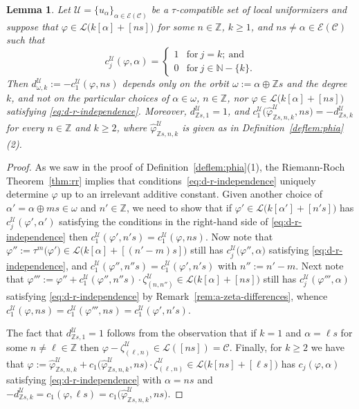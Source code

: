 \documentclass[preprint,12pt]{elsarticle}
\numberwithin{equation}{section} %
\theoremstyle{theorem}
\newtheorem{lemma}[theorem]{Lemma}
\theoremstyle{definition}
\newcommand{\Ca}{\mathcal{C}} %
\newcommand{\ec}{\mathcal{E}} %
\newcommand{\Z}{\mathbb{Z}} %
\newcommand{\za}[2]{\zeta^{\mathcal{U}}_{( {#1} , {#2} )}}
\begin{document}
\begin{lemma}\label{lem:d-r-independence} Let $\mathcal{U}=\{u_\alpha\}_{\alpha\in\ec(\Ca)}$ be a $\tau$-compatible set of local uniformizers and suppose that $\varphi\in\mathcal{L}\bigl(k[\alpha]+[ns]\bigr)$ for some $n\in\Z$, $k\geq 1$, and $ns\neq\alpha\in\ec(\Ca)$ such that \begin{equation}\label{eq:d-r-independence}c_j^\mathcal{U}(\varphi,\alpha)=\begin{cases} 1 & \text{for} \ j=k; \ \text{and} \\0 & \text{for} \ j\in\mathbb{N}-\{ k\}.\end{cases}\end{equation} Then $d^\mathcal{U}_{\omega,k}:=-c_1^\mathcal{U}(\varphi,ns)$ depends only on the orbit $\omega:=\alpha\oplus \Z s$ and the degree~$k$, and not on the particular choices of $\alpha\in\omega$, $n\in\Z$, nor $\varphi\in\mathcal{L}\bigl(k[\alpha]+[ns]\bigr)$ satisfying \eqref{eq:d-r-independence}. Moreover, $d^\mathcal{U}_{\Z s,1}=1$, and $c_1^\mathcal{U}\bigl(\hat{\varphi}^\mathcal{U}_{\Z s,n,k},ns\bigr)=-d^\mathcal{U}_{\Z s, k}$ for every $n\in\Z$ and $k\geq 2$, where $\hat{\varphi}^\mathcal{U}_{\Z s, n, k}$ is given as in Definition~\ref{deflem:phia}(2).
\end{lemma}

\begin{proof}
    As we saw in the proof of Definition~\ref{deflem:phia}(1), the Riemann-Roch Theorem~\ref{thm:rr} implies that conditions~\ref{eq:d-r-independence} uniquely determine $\varphi$ up to an irrelevant additive constant. Given another choice of $\alpha'=\alpha\oplus ms\in\omega$ and $n'\in\Z$, we need to show that if $\varphi'\in\mathcal{L}\bigl(k[\alpha']+[n's]\bigr)$ has $c_j^\mathcal{U}(\varphi',\alpha')$ satisfying the conditions in the right-hand side of \eqref{eq:d-r-independence} then $c_1^\mathcal{U}(\varphi',n's)=c_1^\mathcal{U}(\varphi,ns)$. Now note that
    $\varphi'':=\tau^m\bigl(\varphi'\bigr)\in\mathcal{L}\bigl(k[\alpha]+[(n'-m)s]\bigr)$
    still has $c_j^\mathcal{U}\bigl(\varphi'',\alpha\bigr)$ satisfying \eqref{eq:d-r-independence}, and $c_1^\mathcal{U}(\varphi'',n''s)=c_1^\mathcal{U}(\varphi',n's)$ with $n'':=n'-m$. Next note that
    $\varphi''':=\varphi''+c_1^\mathcal{U}(\varphi'',n''s)\cdot\za{n}{n''}\in\mathcal{L}\bigl(k[\alpha]+[ns]\bigr)$
    still has $c_j^\mathcal{U}(\varphi''',\alpha)$ satisfying \eqref{eq:d-r-independence} by Remark~\ref{rem:a-zeta-differences}, whence $c_1^\mathcal{U}(\varphi,ns)=c_1^\mathcal{U}(\varphi''',ns)=c_1^\mathcal{U}(\varphi',n's)$.
    
    The fact that $d_{\Z s,1}^{\mathcal{U}}=1$ follows from the observation that if $k=1$ and $\alpha=\ell s$ for some $n\neq \ell\in\Z$ then $\varphi-\za{\ell}{n}\in\mathcal{L}([ns])=\Ca$. Finally, for $k\geq 2$ we have that
    $\varphi:=\hat{\varphi}^\mathcal{U}_{\Z s, n, k}+c_1\bigl(\hat{\varphi}^\mathcal{U}_{\Z s,n,k},ns\bigr)\cdot\za{\ell}{n}\in\mathcal{L}\bigl(k[n s]+[\ell s]\bigr)$
    has $c_j(\varphi, \alpha)$ satisfying \eqref{eq:d-r-independence} with $\alpha= ns$ and $-d^\mathcal{U}_{\Z s,k}=c_1(\varphi, \ell s)=c_1\bigl(\hat{\varphi}^\mathcal{U}_{\Z s,n,k},ns\bigr)$. \end{proof}
\end{document}
